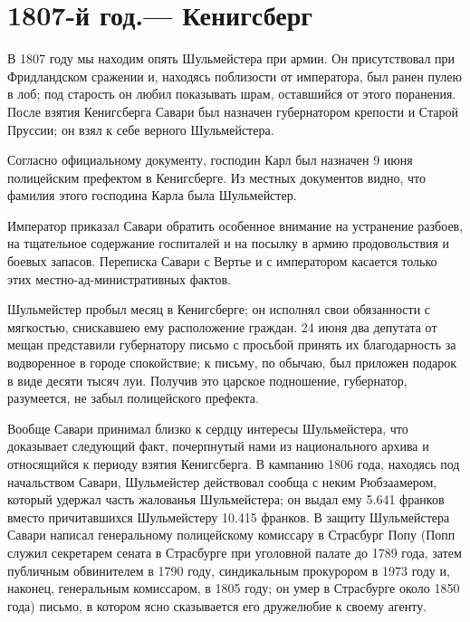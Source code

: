 \documentclass[
  oneside,
  12pt,
  titlepage]{book}
\begin{document}
\hypertarget{ux439-ux433ux43eux434.-ux43aux435ux43dux438ux433ux441ux431ux435ux440ux433}{%
\chapter{1807-й год.--- Кенигсберг}\label{ux439-ux433ux43eux434.-ux43aux435ux43dux438ux433ux441ux431ux435ux440ux433}}

В 1807 году мы находим опять Шульмейстера при армии. Он присутствовал при Фридландском сражении и, находясь поблизости от императора, был ранен пулею в лоб; под старость он любил показывать шрам, оставшийся от этого поранения. После взятия Кенигсберга Савари был назначен губернатором крепости и Старой Пруссии; он взял к себе верного Шульмейстера.

Согласно официальному документу, господин Карл был назначен 9 июня полицейским префектом в Кенигсберге. Из местных документов видно, что фамилия этого господина Карла была Шульмейстер.

Император приказал Савари обратить особенное внимание на устранение разбоев, на тщательное содержание госпиталей и на посылку в армию продовольствия и боевых запасов. Переписка Савари с Вертье и с императором касается только этих местно-ад-министративных фактов.

Шульмейстер пробыл месяц в Кенигсберге; он исполнял свои обязанности с мягкостью, снискавшею ему расположение граждан. 24 июня два депутата от мещан представили губернатору письмо с просьбой принять их благодарность за водворенное в городе спокойствие; к письму, по обычаю, был приложен подарок в виде десяти тысяч луи. Получив это царское подношение, губернатор, разумеется, не забыл полицейского префекта.

Вообще Савари принимал близко к сердцу интересы Шульмейстера, что доказывает следующий факт, почерпнутый нами из национального архива и относящийся к периоду взятия Кенигсберга. В кампанию 1806 года, находясь под начальством Савари, Шульмейстер действовал сообща с неким Рюбзаамером, который удержал часть жалованья Шульмейстера; он выдал ему 5.641 франков вместо причитавшихся Шульмейстеру 10.415 франков. В защиту Шульмейстера Савари написал генеральному полицейскому комиссару в Страсбург Попу (Попп служил секретарем сената в Страсбурге при уголовной палате до 1789 года, затем публичным обвинителем в 1790 году, синдикальным прокурором в 1973 году и, наконец, генеральным комиссаром, в 1805 году; он умер в Страсбурге около 1850 года) письмо, в котором ясно сказывается его дружелюбие к своему агенту.
\end{document}
